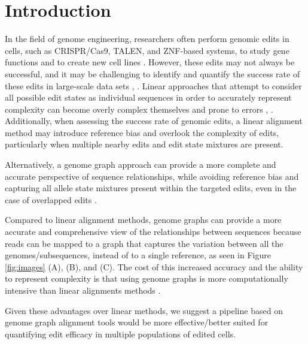 \documentclass{bioinfo}
\theoremstyle{definition}
\begin{document}
\section{Introduction}
\label{sec:introduction}
In the field of genome engineering, researchers often perform genomic edits in cells, such as CRISPR/Cas9, TALEN, and ZNF-based systems, to study gene functions and to create new cell lines \citep{gaj2013zfn}.
However, these edits may not always be successful, and it may be challenging to identify and quantify the success rate of these edits in large-scale data sets \citep{guell2014genome}, \citep{van2020delivery}.
Linear approaches that attempt to consider all possible edit states as individual sequences in order to accurately represent complexity can become overly complex themselves and prone to errors \citep{huang2013short}, \citep{mun2021leviosam}.
Additionally, when assessing the success rate of genomic edits, a linear alignment method may introduce reference bias and overlook the complexity of edits, particularly when multiple nearby edits and edit state mixtures are present.


Alternatively, a genome graph approach can provide a more complete and accurate perspective of sequence relationships, while avoiding reference bias and capturing all allele state mixtures present within the targeted edits, even in the case of overlapped edits \citep{eggertsson2017graphtyper}.

Compared to linear alignment methods, genome graphs can provide a more accurate and comprehensive view \citep{garrison2018variation} of the relationships between sequences \citep{paten2017genome} because reads can be mapped to a graph that captures the variation between all the genomes/subsequences, instead of to a single reference, as seen in Figure \ref{fig:images} (A), (B), and (C).
The cost of this increased accuracy and the ability to represent complexity is that using genome graphs is more computationally intensive than linear alignments methods \citep{rakocevic2019fast}.

Given these advantages over linear methods, we suggest a pipeline based on genome graph alignment tools would be more effective/better suited for quantifying edit efficacy in multiple populations of edited cells. 

\end{document}
